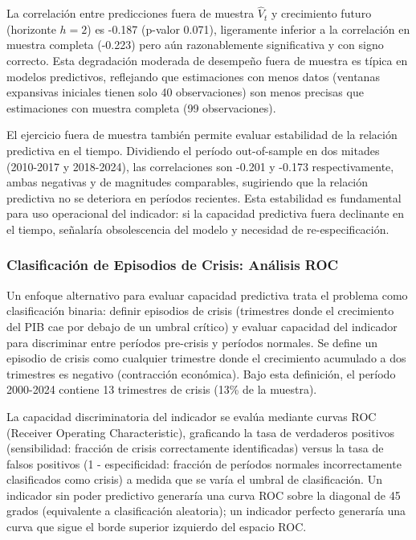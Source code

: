 \documentclass[3p,11pt,draft,natbib=false]{elsarticle}
\begin{document}
La correlación entre predicciones fuera de muestra $\hat{V}_t$ y crecimiento futuro (horizonte $h=2$) es -0.187 (p-valor 0.071), ligeramente inferior a la correlación en muestra completa (-0.223) pero aún razonablemente significativa y con signo correcto. Esta degradación moderada de desempeño fuera de muestra es típica en modelos predictivos, reflejando que estimaciones con menos datos (ventanas expansivas iniciales tienen solo 40 observaciones) son menos precisas que estimaciones con muestra completa (99 observaciones).

El ejercicio fuera de muestra también permite evaluar estabilidad de la relación predictiva en el tiempo. Dividiendo el período out-of-sample en dos mitades (2010-2017 y 2018-2024), las correlaciones son -0.201 y -0.173 respectivamente, ambas negativas y de magnitudes comparables, sugiriendo que la relación predictiva no se deteriora en períodos recientes. Esta estabilidad es fundamental para uso operacional del indicador: si la capacidad predictiva fuera declinante en el tiempo, señalaría obsolescencia del modelo y necesidad de re-especificación.

\subsubsection{Clasificación de Episodios de Crisis: Análisis ROC}

Un enfoque alternativo para evaluar capacidad predictiva trata el problema como clasificación binaria: definir episodios de crisis (trimestres donde el crecimiento del PIB cae por debajo de un umbral crítico) y evaluar capacidad del indicador para discriminar entre períodos pre-crisis y períodos normales. Se define un episodio de crisis como cualquier trimestre donde el crecimiento acumulado a dos trimestres es negativo (contracción económica). Bajo esta definición, el período 2000-2024 contiene 13 trimestres de crisis (13\% de la muestra).

La capacidad discriminatoria del indicador se evalúa mediante curvas ROC (Receiver Operating Characteristic), graficando la tasa de verdaderos positivos (sensibilidad: fracción de crisis correctamente identificadas) versus la tasa de falsos positivos (1 - especificidad: fracción de períodos normales incorrectamente clasificados como crisis) a medida que se varía el umbral de clasificación. Un indicador sin poder predictivo generaría una curva ROC sobre la diagonal de 45 grados (equivalente a clasificación aleatoria); un indicador perfecto generaría una curva que sigue el borde superior izquierdo del espacio ROC.
\end{document}
